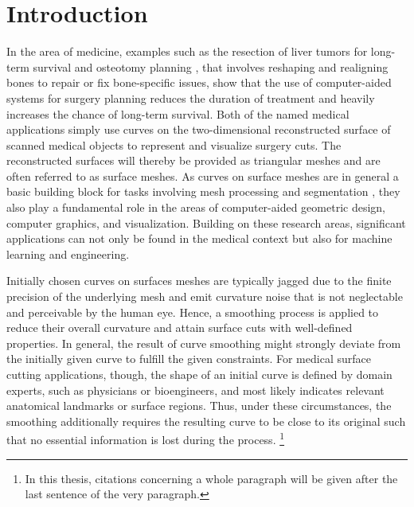 \documentclass{stdlocal}
\begin{document}
\section{Introduction} %
\label{sec:introduction}


In the area of medicine, examples such as the resection of liver tumors for long-term survival \autocite{alirr2019} and osteotomy planning \autocite{zachow2003}, that involves reshaping and realigning bones to repair or fix bone-specific issues, show that the use of computer-aided systems for surgery planning reduces the duration of treatment and heavily increases the chance of long-term survival.
Both of the named medical applications simply use curves on the two-dimensional reconstructed surface of scanned medical objects to represent and visualize surgery cuts.
The reconstructed surfaces will thereby be provided as triangular meshes and are often referred to as surface meshes.
As curves on surface meshes are in general a basic building block for tasks involving mesh processing and segmentation \autocite{ji2006,kaplansky2009}, they also play a fundamental role in the areas of computer-aided geometric design, computer graphics, and visualization.
Building on these research areas, significant applications can not only be found in the medical context but also for machine learning \autocite{benhabiles2011,park2019} and engineering.


Initially chosen curves on surfaces meshes are typically jagged due to the finite precision of the underlying mesh and emit curvature noise that is not neglectable and perceivable by the human eye.
Hence, a smoothing process is applied to reduce their overall curvature and attain surface cuts with well-defined properties.
In general, the result of curve smoothing might strongly deviate from the initially given curve to fulfill the given constraints.
For medical surface cutting applications, though, the shape of an initial curve is defined by domain experts, such as physicians or bioengineers, and most likely indicates relevant anatomical landmarks or surface regions.
Thus, under these circumstances, the smoothing additionally requires the resulting curve to be close to its original such that no essential information is lost during the process.
\autocite{lawonn2014}\footnote{In this thesis, citations concerning a whole paragraph will be given after the last sentence of the very paragraph.}
\end{document}
